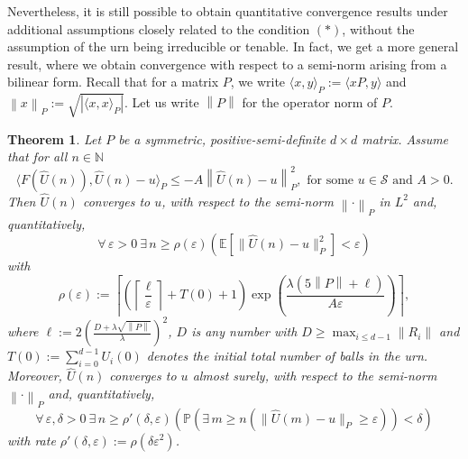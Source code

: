 \documentclass[12pt]{amsart}
\newtheorem{theorem}{Theorem}[section]
\theoremstyle{definition}
\theoremstyle{remark}
\newcommand{\norm}[1]{\left\lVert#1\right\rVert}
\newcommand{\NN}{\mathbb{N}}
\newcommand{\PP}{\mathbb{P}}
\newcommand{\EE}{\mathbb{E}}
\newcommand{\eps}{\varepsilon}
\begin{document}
Nevertheless, it is still possible to obtain quantitative convergence results under additional assumptions closely related to the condition $(*)$, without the assumption of the urn being irreducible or tenable. In fact, we get a more general result, where we obtain convergence with respect to a semi-norm arising from a bilinear form. Recall that for a matrix $P$, we write $\langle x,y\rangle_P:= \langle xP,y\rangle$ and  $\norm{x}_P:= \sqrt{|\langle x,x\rangle_P|}$. Let us write $\norm{P}$ for the operator norm of $P$.
\begin{theorem}\label{Lemma-urns-slow}
  Let $P$ be a symmetric, positive-semi-definite $d \times d$ matrix. Assume that for all $n\in\NN$
  \begin{equation*}
    \langle F(\hat{U}(n)),\hat{U}(n) -u\rangle_P \le-A\norm{\hat{U}(n) -u}_P^2, \text{ for some } u \in \mathcal{S} \text{ and } A > 0.\tag{$**$}
\end{equation*}
Then $\hat{U}(n)$ converges to $u$, with respect to the semi-norm $\norm{\cdot}_P$ in $L^2$ and, quantitatively,
\[
\forall\, \varepsilon > 0\ \exists\, n \geq \rho(\varepsilon) 
\left(\EE[\|\hat{U}(n) - u\|_P^2] < \varepsilon\right)
\]
with
\[
\rho(\varepsilon) := \left\lceil\left(\left\lceil \frac{\ell}{\eps}\right\rceil +T(0)+1\right)\exp\left(\frac{\lambda(5\norm{P}+\ell)}{A\eps}\right)\right\rceil,
\]
where $\ell:=2\left(\frac{D+\lambda\sqrt{\norm{P}}}{\lambda}\right)^2$, $D$ is any number with $D\ge \max_{i\le d-1}\norm{R_i}$ and $T(0):=\sum_{i=0}^{d-1}U_i(0)$ denotes the initial total number of balls in the urn. Moreover, $\hat{U}(n)$ converges to $u$ almost surely, with respect to the semi-norm $\norm{\cdot}_P$ and, quantitatively,
\[
\forall\, \varepsilon, \delta > 0\ \exists\, n \geq \rho'(\delta, \varepsilon)
\left(\PP\left(\exists\, m \geq n \left(\|\hat{U}(m) - u\|_P \geq \varepsilon\right)
\right) < \delta\right)
\]
with rate $\rho'(\delta, \varepsilon) := \rho(\delta\varepsilon^2)$.
\end{theorem}
\end{document}
